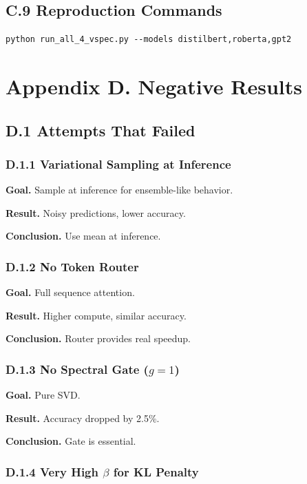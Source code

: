 \subsection{C.9 Reproduction Commands}

\begin{lstlisting}
python run_all_4_vspec.py --models distilbert,roberta,gpt2
\end{lstlisting}



\section{Appendix D. Negative Results}

\subsection{D.1 Attempts That Failed}

\subsubsection{D.1.1 Variational Sampling at Inference}

\textbf{Goal.} Sample at inference for ensemble-like behavior.

\textbf{Result.} Noisy predictions, lower accuracy.

\textbf{Conclusion.} Use mean at inference.

\subsubsection{D.1.2 No Token Router}

\textbf{Goal.} Full sequence attention.

\textbf{Result.} Higher compute, similar accuracy.

\textbf{Conclusion.} Router provides real speedup.

\subsubsection{D.1.3 No Spectral Gate ($g=1$)}

\textbf{Goal.} Pure SVD.

\textbf{Result.} Accuracy dropped by 2.5\%.

\textbf{Conclusion.} Gate is essential.

\subsubsection{D.1.4 Very High $\beta$ for KL Penalty}

